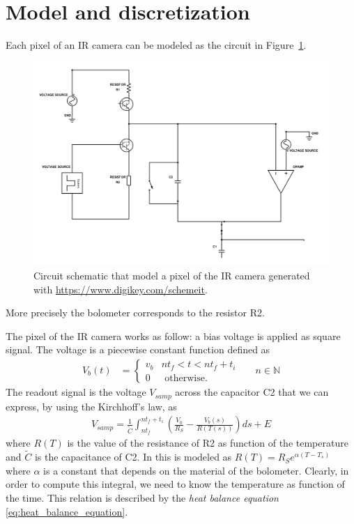 \setlength{\belowcaptionskip}{-15pt}
\setlength{\abovecaptionskip}{0pt}
\section{Model and discretization} \label{sec:model_disc}

Each pixel of an IR camera can be modeled as the circuit in Figure~\ref{fig:circuit}.
\begin{figure}[ht]
 \includegraphics[scale=0.31]{gfx/circuit.png}
\caption{Circuit schematic that model a pixel of the IR camera generated with \url{https://www.digikey.com/schemeit}.}
\label{fig:circuit}
\end{figure}
More precisely the bolometer corresponds to the resistor R2. 

The pixel of the IR camera works as follow: a bias voltage is applied as square signal. The voltage is a piecewise constant function defined as 
\begin{align} \label{eq:Vb}
 V_b(t)&=\begin{cases} v_b & n t_f < t < n t_f + t_i \\
 0 &\mbox{ otherwise.} 
 \end{cases} && n \in {\mathbb N}
\end{align}
The readout signal is the voltage $V_{samp}$ across the capacitor C2 that we can express, by using the Kirchhoff's law, as
\begin{align} \label{eq:Vsamp_def}
 V_{samp} = 
 \frac{1}{\tilde C} \int_{n t_f}^{n t_f + t_i} \left( \frac{V_0}{R_S} - \frac{V_b(s)}{R(T(s))} \right) ds + E
\end{align}
where $R(T)$ is the value of the resistance of R2 as function of the temperature and $\tilde C$ is the capacitance of C2. In \cite{xiu2010research} this is modeled as $R(T)=R_S e^{\alpha(T-T_s)}$ where $\alpha$ is a constant that depends on the material of the bolometer. Clearly, in order to compute this integral, we need to know the temperature as function of the time. This relation is described  by the  \emph{heat balance equation} \eqref{eq:heat_balance_equation}.

